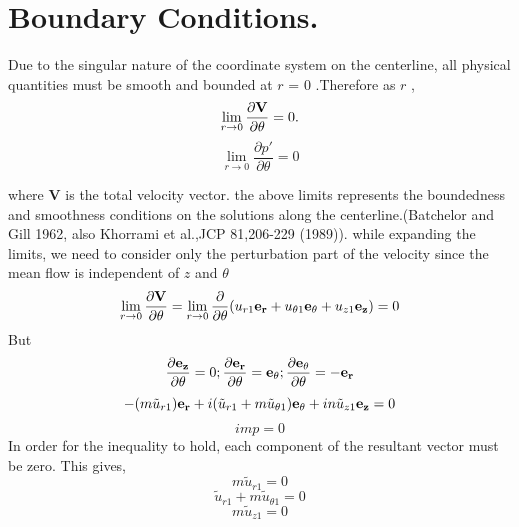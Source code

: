 \documentclass{article}
\begin{document}
\section{Boundary Conditions.}
Due to the singular nature of the coordinate system on the centerline, all physical quantities must be smooth and bounded at $r$ = 0 .Therefore as   $r$ ,
\begin{equation}
\lim _{r\rightarrow {0}}\frac{\partial \bf V}{\partial \theta} = 0.
\end{equation}
\begin{equation}
\lim_{r\rightarrow{0}}\frac{\partial p'}{\partial \theta} = 0
\end{equation}

where  {\bf V} is the total velocity vector. the above limits represents the boundedness and smoothness conditions on the solutions along the centerline.(Batchelor and Gill 1962, also Khorrami et al.,JCP 81,206-229 (1989)).  
while expanding the limits, we need to consider only the perturbation part of the velocity since the mean flow is independent of $z$ and $\theta$
\begin{equation*}
\lim _{r\rightarrow {0}}\frac{\partial \bf V}{\partial \theta} = \lim_{r\rightarrow{0}}\frac{\partial}{\partial \theta}(u_{r1}{\bf e_{r}} + u_{\theta 1}{\bf e_{\theta}} + u_{z1}{\bf e_{z}}) = 0
\end{equation*}
But 
\begin{equation}
\frac{\partial {\bf e_{z}}}{\partial \theta} = 0; \frac{\partial {\bf e_{r}}}{\partial \theta} ={\bf e_{\theta}}; \frac{\partial {\bf e_{\theta}}}{\partial \theta} = -{\bf e_{r}}
\end{equation}
\begin{equation*}
-(m\tilde{u}_{r1}){\bf e_{r}} + i(\tilde{u}_{r1}+m\tilde{u}_{\theta1}){\bf e_{\theta}} + in\tilde{u}_{z1}{\bf e_{z}}=0
\end{equation*}
\begin{equation*}
imp = 0
\end{equation*}
In order for the inequality to hold, each component of the resultant vector must be zero. This gives,
\begin{equation}
m\tilde{u}_{r1}=0
\end{equation}
\begin{equation}
\tilde{u}_{r1}+m\tilde{u}_{\theta1} = 0
\end{equation}
\begin{equation}
m\tilde{u}_{z1} =0
\end{equation}
\end{document}
